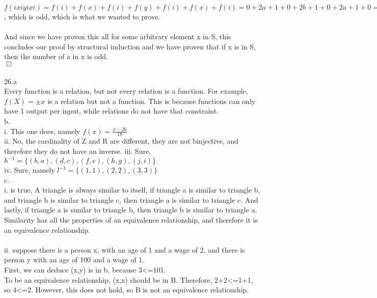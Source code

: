 \documentclass{article}
\begin{document}
$f(ixiyixi) = f(i)+f(x)+f(i)+f(y)+f(i)+f(x)+f(i) = 0+ 2a+1 + 0 + 2b+1 + 0 + 2a+1 + 0 = 2(2a+b+1)+1$, which is odd, which is what we wanted to prove.\\
\\
And since we have proven this all for some arbitrary element x in S, this concludes our proof by structural induction and we have proven that if x is in S, then the number of a in x is odd.\\
$\Box$\\
\\
26.a\\
Every function is a relation, but not every relation is a function. For example, $f(X) = \pm x$ is a relation but not a function. This is because functions can only have 1 output per input, while relations do not have that constraint.\\

b.\\
i. This one does, namely $f(x) = \frac{x-26}{18}$\\
ii. No, the cardinality of Z and R are different, they are not binjective, and therefore they do not have an inverse.
iii. Sure, $h^{-1} = \{(b,a),(d,c),(f,e),(h,g),(j,i)\}$\\
iv. Sure, namely $l^{-1} = \{(1,1),(2,2),(3,3)\}$\\
c. \\
i. is true, A triangle is always similar to itself, if triangle a is similar to triangle b, and triangle b is similar to triangle c, then triangle a is similar to triangle c. And lastly, if triangle a is similar to triangle b, then triangle b is similar to triangle a. Similarity has all the properties of an equivalence relationship, and therefore it is an equivalence relationship. \\
\\
ii. suppose there is a person x, with an age of 1 and a wage of 2, and there is person y with an age of 100 and a wage of 1. \\
First, we can deduce (x,y) is in b, because
3<=101. \\
To be an equivalence relationship, (x,x) should be in B. Therefore, 2+2<=1+1, so 4<=2. However, this does not hold, so B is not an equivalence relationship. 
\end{document}
